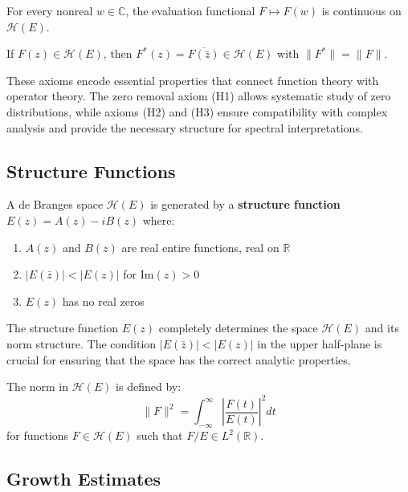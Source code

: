 \begin{axiom}
For every nonreal $w \in \mathbb{C}$, the evaluation functional $F \mapsto F(w)$ is continuous on $\mathcal{H}(E)$.
\end{axiom}

\begin{axiom}
If $F(z) \in \mathcal{H}(E)$, then $F^*(z) = \overline{F(\bar{z})} \in \mathcal{H}(E)$ with $\|F^*\| = \|F\|$.
\end{axiom}

These axioms encode essential properties that connect function theory with operator theory. The zero removal axiom (H1) allows systematic study of zero distributions, while axioms (H2) and (H3) ensure compatibility with complex analysis and provide the necessary structure for spectral interpretations.

\subsection{Structure Functions}

\begin{definition}
A de Branges space $\mathcal{H}(E)$ is generated by a \textbf{structure function} $E(z) = A(z) - iB(z)$ where:
\begin{enumerate}
\item $A(z)$ and $B(z)$ are real entire functions, real on $\mathbb{R}$
\item $|E(\bar{z})| < |E(z)|$ for $\text{Im}(z) > 0$
\item $E(z)$ has no real zeros
\end{enumerate}
\end{definition}

The structure function $E(z)$ completely determines the space $\mathcal{H}(E)$ and its norm structure. The condition $|E(\bar{z})| < |E(z)|$ in the upper half-plane is crucial for ensuring that the space has the correct analytic properties.

\begin{definition}
The norm in $\mathcal{H}(E)$ is defined by:
$$\|F\|^2 = \int_{-\infty}^{\infty} \left|\frac{F(t)}{E(t)}\right|^2 dt$$
for functions $F \in \mathcal{H}(E)$ such that $F/E \in L^2(\mathbb{R})$.
\end{definition}

\subsection{Growth Estimates}

